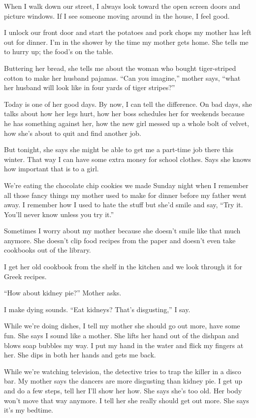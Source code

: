 \documentclass[twoside,10pt]{book}
\begin{document}
When I walk down our street, I always look toward the open screen doors
and picture windows. If I see someone moving around in the house, I feel
good.

I unlock our front door and start the potatoes and pork chops my mother
has left out for dinner. I'm in the shower by the time my mother gets
home. She tells me to hurry up; the food's on the table.

Buttering her bread, she tells me about the woman who bought
tiger-striped cotton to make her husband pajamas. ``Can you imagine,''
mother says, ``what her husband will look like in four yards of tiger
stripes?''

Today is one of her good days. By now, I can tell the difference. On bad
days, she talks about how her legs hurt, how her boss schedules her for
weekends because he has something against her, how the new girl messed
up a whole bolt of velvet, how she's about to quit and find another job.

But tonight, she says she might be able to get me a part-time job there
this winter. That way I can have some extra money for school clothes.
Says she knows how important that is to a girl.

We're eating the chocolate chip cookies we made Sunday night when I
remember all those fancy things my mother used to make for dinner before
my father went away. I remember how I used to hate the stuff but she'd
smile and say, ``Try it. You'll never know unless you try it.''

Sometimes I worry about my mother because she doesn't smile like that
much anymore. She doesn't clip food recipes from the paper and doesn't
even take cookbooks out of the library.

I get her old cookbook from the shelf in the kitchen and we look through
it for Greek recipes.

``How about kidney pie?'' Mother asks.

I make dying sounds. ``Eat kidneys? That's disgusting,'' I say.

While we're doing dishes, I tell my mother she should go out more, have
some fun. She says I sound like a mother. She lifts her hand out of the
dishpan and blows soap bubbles my way. I put my hand in the water and
flick my fingers at her. She dips in both her hands and gets me back.

While we're watching television, the detective tries to trap the killer
in a disco bar. My mother says the dancers are more disgusting than
kidney pie. I get up and do a few steps, tell her I'll show her how. She
says she's too old. Her body won't move that way anymore. I tell her she
really should get out more. She says it's my bedtime.
\end{document}
